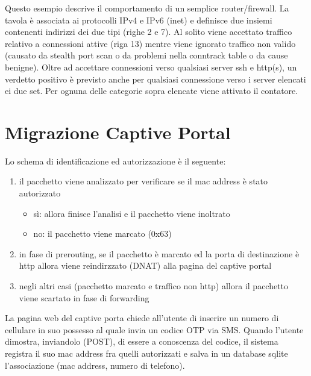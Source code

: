 \noindent Questo esempio descrive il comportamento di un semplice
router/firewall. La tavola è associata ai protocolli IPv4 e IPv6 (inet) e
definisce due insiemi contenenti indirizzi dei due tipi (righe 2 e 7).
Al solito viene accettato traffico relativo a connessioni attive (riga 13)
mentre viene ignorato traffico non valido (causato da stealth port scan o da
problemi nella conntrack table o da cause benigne).
Oltre ad accettare connessioni verso qualsiasi server ssh e http(s), un
verdetto positivo è previsto anche per qualsiasi connessione verso i server
elencati ei due set.
Per ognuna delle categorie sopra elencate viene attivato il contatore.


\chapter{Migrazione Captive Portal}

Lo schema di identificazione ed autorizzazione è il seguente:
\begin{enumerate}
    \item il pacchetto viene analizzato per verificare se il mac
    address è stato autorizzato
    \begin{itemize}
        \item sì: allora finisce l'analisi e il pacchetto viene inoltrato
        \item no: il pacchetto viene marcato (0x63)
    \end{itemize}
    \item in fase di prerouting, se il pacchetto è marcato ed la porta di
    destinazione è http allora viene reindirzzato (DNAT) alla pagina del
    captive portal
    \item negli altri casi (pacchetto marcato e traffico non http) allora il
    pacchetto viene scartato in fase di forwarding
\end{enumerate}

La pagina web del captive porta chiede all'utente di inserire un numero di
cellulare in suo possesso al quale invia un codice OTP via SMS. Quando
l'utente dimostra, inviandolo (POST), di essere a conoscenza del codice, il
sistema registra il suo mac address fra quelli autorizzati e salva in un
database sqlite l'associazione (mac address, numero di telefono).

